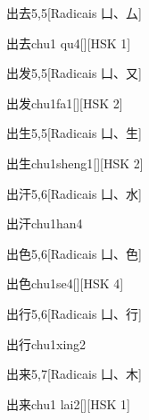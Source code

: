 \begin{entry}{出去}{5,5}[Radicais ⼐、⼛]
  \begin{phonetics}{出去}{chu1 qu4}[][HSK 1]
  \end{phonetics}
\end{entry}

\begin{entry}{出发}{5,5}[Radicais ⼐、⼜]
  \begin{phonetics}{出发}{chu1fa1}[][HSK 2]
  \end{phonetics}
\end{entry}

\begin{entry}{出生}{5,5}[Radicais ⼐、⽣]
  \begin{phonetics}{出生}{chu1sheng1}[][HSK 2]
  \end{phonetics}
\end{entry}

\begin{entry}{出汗}{5,6}[Radicais ⼐、⽔]
  \begin{phonetics}{出汗}{chu1han4}
  \end{phonetics}
\end{entry}

\begin{entry}{出色}{5,6}[Radicais ⼐、⾊]
  \begin{phonetics}{出色}{chu1se4}[][HSK 4]
  \end{phonetics}
\end{entry}

\begin{entry}{出行}{5,6}[Radicais ⼐、⾏]
  \begin{phonetics}{出行}{chu1xing2}
  \end{phonetics}
\end{entry}

\begin{entry}{出来}{5,7}[Radicais ⼐、⽊]
  \begin{phonetics}{出来}{chu1 lai2}[][HSK 1]
  \end{phonetics}
\end{entry}

